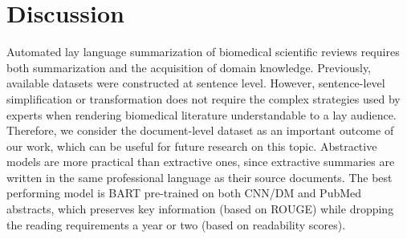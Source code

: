 \documentclass[letterpaper, table]{article} %
\begin{document}











\section{Discussion}
Automated lay language summarization of biomedical scientific reviews requires both summarization and the acquisition of domain knowledge.
Previously, available datasets 
were constructed at sentence level. However, sentence-level simplification or transformation does not require the complex strategies used by experts when rendering biomedical literature understandable to a lay audience. Therefore, we consider the 
document-level dataset as an important outcome of our work,  which 
can be useful for future research on this topic.
Abstractive models are more practical than extractive ones, 
since extractive summaries 
are written
in the same professional language as their source documents. 
The best performing model is BART pre-trained on both CNN/DM and PubMed abstracts, which preserves key information (based on ROUGE) while dropping the reading requirements a year or two (based on readability scores).  
\end{document}
